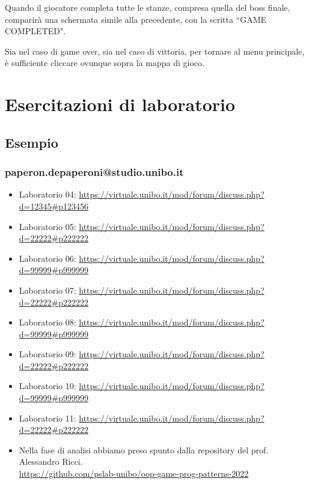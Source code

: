 \documentclass[a4paper,12pt]{report}
\begin{document}
Quando il giocatore completa tutte le stanze, compresa quella del boss finale, comparirà una
schermata simile alla precedente, con la scritta ``GAME COMPLETED".

Sia nel caso di game over, sia nel caso di vittoria, per tornare al menu principale, è sufficiente cliccare 
ovunque sopra la mappa di gioco.


\chapter{Esercitazioni di laboratorio}

\section*{Esempio}

\subsection{paperon.depaperoni@studio.unibo.it}

\begin{itemize}
    \item Laboratorio 04: \url{https://virtuale.unibo.it/mod/forum/discuss.php?d=12345#p123456}
    \item Laboratorio 05: \url{https://virtuale.unibo.it/mod/forum/discuss.php?d=22222#p222222}
    \item Laboratorio 06: \url{https://virtuale.unibo.it/mod/forum/discuss.php?d=99999#p999999}
    \item Laboratorio 07: \url{https://virtuale.unibo.it/mod/forum/discuss.php?d=22222#p222222}
    \item Laboratorio 08: \url{https://virtuale.unibo.it/mod/forum/discuss.php?d=99999#p999999}
    \item Laboratorio 09: \url{https://virtuale.unibo.it/mod/forum/discuss.php?d=22222#p222222}
    \item Laboratorio 10: \url{https://virtuale.unibo.it/mod/forum/discuss.php?d=99999#p999999}
    \item Laboratorio 11: \url{https://virtuale.unibo.it/mod/forum/discuss.php?d=22222#p222222}
\end{itemize}




\begin{itemize}
    \item Nella fase di analisi abbiamo preso spunto dalla repository del prof. Alessandro Ricci. 
    \\\url{https://github.com/pslab-unibo/oop-game-prog-patterns-2022} 
\end{itemize}
\end{document}
